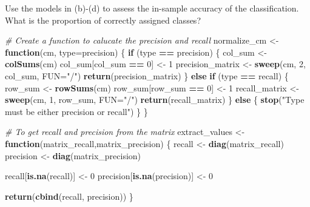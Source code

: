 \documentclass[
]{article}
\newenvironment{Shaded}{\begin{snugshade}}{\end{snugshade}}
\newcommand{\AttributeTok}[1]{\textcolor[rgb]{0.13,0.29,0.53}{#1}}
\newcommand{\CommentTok}[1]{\textcolor[rgb]{0.56,0.35,0.01}{\textit{#1}}}
\newcommand{\ControlFlowTok}[1]{\textcolor[rgb]{0.13,0.29,0.53}{\textbf{#1}}}
\newcommand{\DecValTok}[1]{\textcolor[rgb]{0.00,0.00,0.81}{#1}}
\newcommand{\FunctionTok}[1]{\textcolor[rgb]{0.13,0.29,0.53}{\textbf{#1}}}
\newcommand{\NormalTok}[1]{#1}
\newcommand{\OtherTok}[1]{\textcolor[rgb]{0.56,0.35,0.01}{#1}}
\newcommand{\SpecialCharTok}[1]{\textcolor[rgb]{0.81,0.36,0.00}{\textbf{#1}}}
\newcommand{\StringTok}[1]{\textcolor[rgb]{0.31,0.60,0.02}{#1}}
\begin{document}
Use the models in (b)-(d) to assess the in-sample accuracy of the
classification. What is the proportion of correctly assigned classes?

\begin{Shaded}
\begin{Highlighting}[]
\CommentTok{\# Create a function to calucate the precision and recall}
\NormalTok{normalize\_cm }\OtherTok{\textless{}{-}} \ControlFlowTok{function}\NormalTok{(cm, }\AttributeTok{type=}\StringTok{\textquotesingle{}precision\textquotesingle{}}\NormalTok{) \{}
  \ControlFlowTok{if}\NormalTok{ (type }\SpecialCharTok{==} \StringTok{\textquotesingle{}precision\textquotesingle{}}\NormalTok{) \{}
\NormalTok{    col\_sum }\OtherTok{\textless{}{-}} \FunctionTok{colSums}\NormalTok{(cm)}
\NormalTok{    col\_sum[col\_sum }\SpecialCharTok{==} \DecValTok{0}\NormalTok{] }\OtherTok{\textless{}{-}} \DecValTok{1}
\NormalTok{    precision\_matrix }\OtherTok{\textless{}{-}} \FunctionTok{sweep}\NormalTok{(cm, }\DecValTok{2}\NormalTok{, col\_sum, }\AttributeTok{FUN=}\StringTok{"/"}\NormalTok{)}
    \FunctionTok{return}\NormalTok{(precision\_matrix)}
\NormalTok{  \} }\ControlFlowTok{else} \ControlFlowTok{if}\NormalTok{ (type }\SpecialCharTok{==} \StringTok{\textquotesingle{}recall\textquotesingle{}}\NormalTok{) \{}
\NormalTok{    row\_sum }\OtherTok{\textless{}{-}} \FunctionTok{rowSums}\NormalTok{(cm)}
\NormalTok{    row\_sum[row\_sum }\SpecialCharTok{==} \DecValTok{0}\NormalTok{] }\OtherTok{\textless{}{-}} \DecValTok{1}
\NormalTok{    recall\_matrix }\OtherTok{\textless{}{-}} \FunctionTok{sweep}\NormalTok{(cm, }\DecValTok{1}\NormalTok{, row\_sum, }\AttributeTok{FUN=}\StringTok{"/"}\NormalTok{)}
    \FunctionTok{return}\NormalTok{(recall\_matrix)}
\NormalTok{  \} }\ControlFlowTok{else}\NormalTok{ \{}
    \FunctionTok{stop}\NormalTok{(}\StringTok{"Type must be either \textquotesingle{}precision\textquotesingle{} or \textquotesingle{}recall\textquotesingle{}"}\NormalTok{)}
\NormalTok{  \}}
\NormalTok{\}}

\CommentTok{\# To get recall and precision from the matrix}
\NormalTok{extract\_values }\OtherTok{\textless{}{-}} \ControlFlowTok{function}\NormalTok{(matrix\_recall,matrix\_precision) \{}
\NormalTok{  recall }\OtherTok{\textless{}{-}} \FunctionTok{diag}\NormalTok{(matrix\_recall)}
\NormalTok{  precision }\OtherTok{\textless{}{-}} \FunctionTok{diag}\NormalTok{(matrix\_precision)}
  

\NormalTok{  recall[}\FunctionTok{is.na}\NormalTok{(recall)] }\OtherTok{\textless{}{-}} \DecValTok{0}
\NormalTok{  precision[}\FunctionTok{is.na}\NormalTok{(precision)] }\OtherTok{\textless{}{-}} \DecValTok{0}

  \FunctionTok{return}\NormalTok{(}\FunctionTok{cbind}\NormalTok{(recall, precision))}
\NormalTok{\}}
\end{Highlighting}
\end{Shaded}
\end{document}
